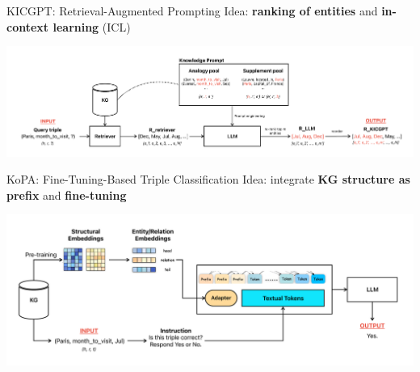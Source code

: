\documentclass[aspectratio=169,xcolor=dvipsnames]{beamer}
\begin{document}
\begin{frame}{KICGPT: Retrieval-Augmented Prompting}
    Idea: \textbf{ranking of entities} and \textbf{in-context learning} (ICL)
    \begin{center}
        \includegraphics[width=1.02\linewidth]{images/KICGPT}
    \end{center}
\end{frame}


\begin{frame}{KoPA: Fine-Tuning-Based Triple Classification}
    Idea: integrate \textbf{KG structure as prefix} and \textbf{fine-tuning}
    \begin{center}
        \centering
        \includegraphics[width=1\linewidth]{images/KoPA}
    \end{center}
\end{frame}
\end{document}

